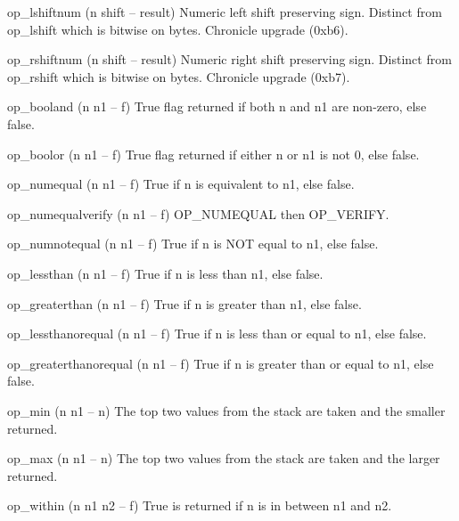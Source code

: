 \documentclass[a4paper, 11pt, openany]{book}
\begin{document}
\begin{forthbox}
  op_lshiftnum           (n shift -- result)
                         Numeric left shift preserving sign. Distinct
                         from op\_lshift which is bitwise on bytes.
                         Chronicle upgrade (0xb6).

  op_rshiftnum           (n shift -- result)
                         Numeric right shift preserving sign. Distinct
                         from op\_rshift which is bitwise on bytes.
                         Chronicle upgrade (0xb7).

  op_booland             (n n1 -- f)
                         True flag returned if both n and n1 are
                         non-zero, else false.

  op_boolor              (n n1 -- f)
                         True flag returned if either n or n1 is
                         not 0, else false.

  op_numequal            (n n1 -- f)
                         True if n is equivalent to n1, else
                         false.

  op_numequalverify      (n n1 -- f)
                         OP_NUMEQUAL then OP_VERIFY.

  op_numnotequal         (n n1 -- f)
                         True if n is NOT equal to n1, else
                         false.

  op_lessthan            (n n1 -- f)
                         True if n is less than n1, else false.

  op_greaterthan         (n n1 -- f)
                         True if n is greater than n1, else
                         false.

  op_lessthanorequal     (n n1 -- f)
                         True if n is less than or equal to n1,
                         else false.

  op_greaterthanorequal  (n n1 -- f)
                         True if n is greater than or equal to
                         n1, else false.

  op_min                 (n n1 -- n)
                         The top two values from the stack are
                         taken and the smaller returned.

  op_max                 (n n1 -- n)
                         The top two values from the stack are
                         taken and the larger returned.

  op_within              (n n1 n2 -- f)
                         True is returned if n is in between n1
                         and n2.
\end{forthbox}
\end{document}
